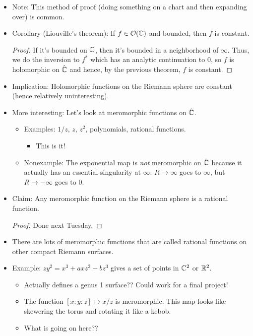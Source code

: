 \documentclass[../notes.tex]{subfiles}
\begin{document}
\begin{itemize}
    \item Note: This method of proof (doing something on a chart and then expanding over) is common.
    \item Corollary (Liouville's theorem): If $f\in\mathcal{O}(\mathbb{C})$ and bounded, then $f$ is constant.
    \begin{proof}
        If it's bounded on $\mathbb{C}$, then it's bounded in a neighborhood of $\infty$. Thus, we do the inversion to $f^*$ which has an analytic continuation to 0, so $f$ is holomorphic on $\hat{\mathbb{C}}$ and hence, by the previous theorem, $f$ is constant.
    \end{proof}
    \item Implication: Holomorphic functions on the Riemann sphere are constant (hence relatively uninteresting).
    \item More interesting: Let's look at meromorphic functions on $\hat{\mathbb{C}}$.
    \begin{itemize}
        \item Examples: $1/z$, $z$, $z^2$, polynomials, rational functions.
        \begin{itemize}
            \item This is it!
        \end{itemize}
        \item Nonexample: The exponential map is \emph{not} meromorphic on $\hat{\mathbb{C}}$ because it actually has an essential singularity at $\infty$: $R\to\infty$ goes to $\infty$, but $R\to-\infty$ goes to 0.
    \end{itemize}
    \item Claim: Any meromorphic function on the Riemann sphere is a rational function.
    \begin{proof}
        Done next Tuesday.
    \end{proof}
    \item There are lots of meromorphic functions that are called rational functions on other compact Riemann surfaces.
    \item Example: $zy^2=x^3+axz^2+bz^3$ gives a set of points in $\mathbb{C}^2$ or $\mathbb{R}^2$.
    \begin{itemize}
        \item Actually defines a genus 1 surface?? Could work for a final project!
        \item The function $[x:y:z]\mapsto x/z$ is meromorphic. This map looks like skewering the torus and rotating it like a kebob.
        \item What is going on here??
    \end{itemize}

\end{itemize}
\end{document}
